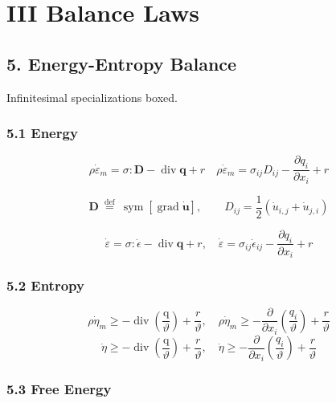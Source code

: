 \hypertarget{iii-balance-laws}{%
\section{III Balance Laws}\label{iii-balance-laws}}

\hypertarget{energy-entropy-balance}{%
\subsection{5. Energy-Entropy Balance}\label{energy-entropy-balance}}

Infinitesimal specializations boxed.

\hypertarget{energy}{%
\subsubsection{5.1 Energy}\label{energy}}

\[\rho \dot{\varepsilon}_{m}=\sigma: \mathbf{D}-\operatorname{div} \mathbf{q}+r \quad \rho \dot{\varepsilon}_{m}=\sigma_{i j} D_{i j}-\frac{\partial q_{i}}{\partial x_{i}}+r\]

\[\mathbf{D} \stackrel{\text { def }}{=} \operatorname{sym}[\operatorname{grad} \dot{\mathbf{u}}], \quad \quad D_{i j}=\frac{1}{2}\left(\dot{u}_{i, j}+\dot{u}_{j, i}\right)\]

\[\boxed{\dot{\varepsilon}=\sigma: \dot{\epsilon}-\operatorname{div} \mathbf{q}+r, \quad \dot{\varepsilon}=\sigma_{i j} \dot{\epsilon}_{i j}-\frac{\partial q_{i}}{\partial x_{i}}+r
}\]

\hypertarget{entropy}{%
\subsubsection{5.2 Entropy}\label{entropy}}

\[\rho \dot{\eta}_{m} \geq-\operatorname{div}\left(\frac{\mathrm{q}}{\vartheta}\right)+\frac{r}{\vartheta}, \quad \rho \dot{\eta}_{m} \geq-\frac{\partial}{\partial x_{i}}\left(\frac{q_{i}}{\vartheta}\right)+\frac{r}{\vartheta}\]
\[\boxed{\dot{\eta} \geq-\operatorname{div}\left(\frac{\mathrm{q}}{\vartheta}\right)+\frac{r}{\vartheta}, \quad \dot{\eta} \geq-\frac{\partial}{\partial x_{i}}\left(\frac{q_{i}}{\vartheta}\right)+\frac{r}{\vartheta}}\]

\hypertarget{free-energy}{%
\subsubsection{5.3 Free Energy}\label{free-energy}}

